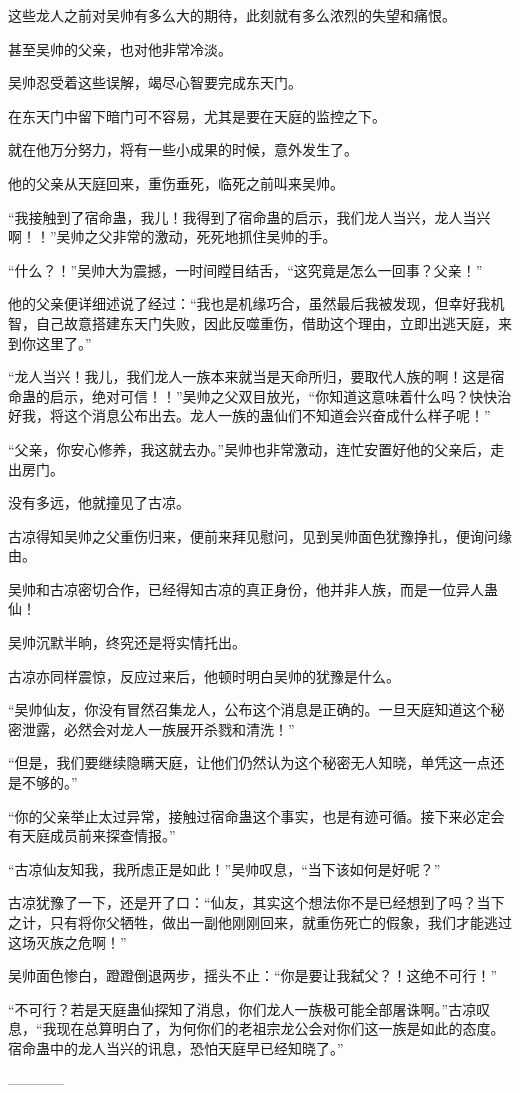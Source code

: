 \begin{this_body}
这些龙人之前对吴帅有多么大的期待，此刻就有多么浓烈的失望和痛恨。

甚至吴帅的父亲，也对他非常冷淡。

吴帅忍受着这些误解，竭尽心智要完成东天门。

在东天门中留下暗门可不容易，尤其是要在天庭的监控之下。

就在他万分努力，将有一些小成果的时候，意外发生了。

他的父亲从天庭回来，重伤垂死，临死之前叫来吴帅。

“我接触到了宿命蛊，我儿！我得到了宿命蛊的启示，我们龙人当兴，龙人当兴啊！！”吴帅之父非常的激动，死死地抓住吴帅的手。

“什么？！”吴帅大为震撼，一时间瞠目结舌，“这究竟是怎么一回事？父亲！”

他的父亲便详细述说了经过：“我也是机缘巧合，虽然最后我被发现，但幸好我机智，自己故意搭建东天门失败，因此反噬重伤，借助这个理由，立即出逃天庭，来到你这里了。”

“龙人当兴！我儿，我们龙人一族本来就当是天命所归，要取代人族的啊！这是宿命蛊的启示，绝对可信！！”吴帅之父双目放光，“你知道这意味着什么吗？快快治好我，将这个消息公布出去。龙人一族的蛊仙们不知道会兴奋成什么样子呢！”

“父亲，你安心修养，我这就去办。”吴帅也非常激动，连忙安置好他的父亲后，走出房门。

没有多远，他就撞见了古凉。

古凉得知吴帅之父重伤归来，便前来拜见慰问，见到吴帅面色犹豫挣扎，便询问缘由。

吴帅和古凉密切合作，已经得知古凉的真正身份，他并非人族，而是一位异人蛊仙！

吴帅沉默半晌，终究还是将实情托出。

古凉亦同样震惊，反应过来后，他顿时明白吴帅的犹豫是什么。

“吴帅仙友，你没有冒然召集龙人，公布这个消息是正确的。一旦天庭知道这个秘密泄露，必然会对龙人一族展开杀戮和清洗！”

“但是，我们要继续隐瞒天庭，让他们仍然认为这个秘密无人知晓，单凭这一点还是不够的。”

“你的父亲举止太过异常，接触过宿命蛊这个事实，也是有迹可循。接下来必定会有天庭成员前来探查情报。”

“古凉仙友知我，我所虑正是如此！”吴帅叹息，“当下该如何是好呢？”

古凉犹豫了一下，还是开了口：“仙友，其实这个想法你不是已经想到了吗？当下之计，只有将你父牺牲，做出一副他刚刚回来，就重伤死亡的假象，我们才能逃过这场灭族之危啊！”

吴帅面色惨白，蹬蹬倒退两步，摇头不止：“你是要让我弑父？！这绝不可行！”

“不可行？若是天庭蛊仙探知了消息，你们龙人一族极可能全部屠诛啊。”古凉叹息，“我现在总算明白了，为何你们的老祖宗龙公会对你们这一族是如此的态度。宿命蛊中的龙人当兴的讯息，恐怕天庭早已经知晓了。”

------------

\end{this_body}

